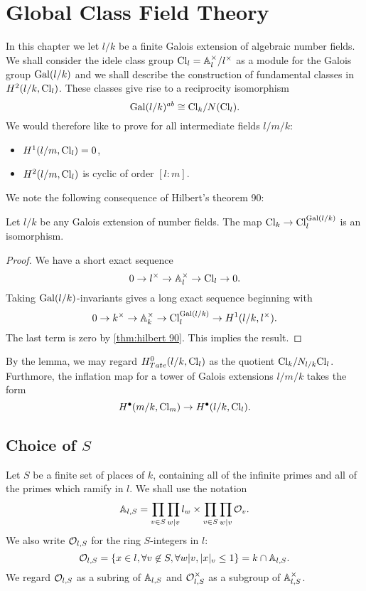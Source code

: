\chapter{Global Class Field Theory}

In this chapter we let $l/k$ be a finite Galois extension of
algebraic number fields. We shall consider the idele class group $\mathrm{Cl}_l = {\mathbb A}_l^\times / l^\times$
as a module for the Galois group $\mathrm{Gal}(l/k)$ and we shall describe the construction of
fundamental classes in $H^2(l/k, \mathrm{Cl}_l)$.
These classes give rise to a reciprocity isomorphism
\[
	\mathrm{Gal}(l/k)^{ab} \cong \mathrm{Cl}_k / N(\mathrm{Cl}_l).
\]
We would therefore like to prove for all intermediate fields $l / m / k$:
\begin{itemize}
	\item
	$H^1(l/m, \mathrm{Cl}_l) = 0$,
	\item
	$H^2(l/m, \mathrm{Cl}_l)$ is cyclic of order $[l:m]$.
\end{itemize}

We note the following consequence of Hilbert's theorem 90:

\begin{lemma} \label{lem:idele class invariants}
	Let $l/k$ be any Galois extension of number fields.
	The map $\mathrm{Cl}_k \to \mathrm{Cl}_l ^ {\mathrm{Gal}(l/k)}$ is an isomorphism.
\end{lemma}

\begin{proof}
	We have a short exact sequence
	\[
		0 \to l^\times \to {\mathbb A}_l^\times \to \mathrm{Cl}_l \to 0.
	\]
	Taking $\mathrm{Gal}(l/k)$-invariants gives a long exact sequence beginning with
	\[
		0 \to k^\times \to {\mathbb A}_k^\times \to \mathrm{Cl}_l^{\mathrm{Gal}(l/k)} \to H^1(l/k, l^\times).
	\]
	The last term is zero by \ref{thm:hilbert 90}. This implies the result.
\end{proof}

By the lemma, we may regard $H^0_{Tate}(l/k,\mathrm{Cl}_l)$ as the quotient
$\mathrm{Cl}_k / N_{l/k} \mathrm{Cl}_l$.
Furthmore, the inflation map for a tower of Galois extensions $l/m/k$ takes the form
\[
	H^\bullet(m/k, \mathrm{Cl}_m) \to H^\bullet(l/k, \mathrm{Cl}_l).
\]







\section{Choice of $S$}

Let $S$ be a finite set of places of $k$, containing all of the infinite primes and all
of the primes which ramify in $l$.
We shall use the notation
\[
	{\mathbb A}_{l,S} = \prod_{v \in S} \prod_{w | v} l_w \times \prod_{v \in S} \prod_{w | v} {\mathcal O}_v.
\]
We also write ${\mathcal O}_{l,S}$ for the ring $S$-integers in $l$:
\[
	{\mathcal O}_{l,S} = \{x \in l, \forall v \not\in S, \forall w | v, |x|_v \le 1\} = k \cap {\mathbb A}_{l,S}.
\]
We regard ${\mathcal O}_{l,S}$ as a subring of ${\mathbb A}_{l,S}$ and
${\mathcal O}_{l,S}^\times$ as a subgroup of ${\mathbb A}_{l,S}^\times$.

